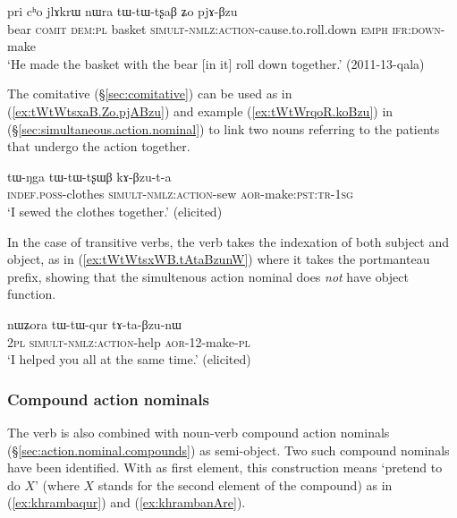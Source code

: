 \begin{exe}
	\ex \label{ex:tWtWtsxaB.Zo.pjABzu}
	\gll  pri cʰo jlɤkrɯ nɯra tɯ-tɯ-tʂaβ ʑo pjɤ-βzu  \\
	bear \textsc{comit} \textsc{dem}:\textsc{pl}  basket  \textsc{simult}-\textsc{nmlz}:\textsc{action}-cause.to.roll.down \textsc{emph} \textsc{ifr}:\textsc{down}-make \\
	\glt `He made the basket with the bear [in it] roll down together.' (2011-13-qala) 
\end{exe}

The comitative (§\ref{sec:comitative}) can be used as in (\ref{ex:tWtWtsxaB.Zo.pjABzu}) and example  (\ref{ex:tWtWrqoR.koBzu}) in  (§\ref{sec:simultaneous.action.nominal}) to link two nouns referring to the patients that undergo the action together.

\begin{exe}
	\ex \label{ex:tWtWtsxWB.kABzuta}
	\gll   tɯ-ŋga tɯ-tɯ-tʂɯβ kɤ-βzu-t-a \\
	\textsc{indef}.\textsc{poss}-clothes \textsc{simult}-\textsc{nmlz}:\textsc{action}-sew \textsc{aor}-make:\textsc{pst}:\textsc{tr}-\textsc{1sg} \\
	\glt `I sewed the clothes together.' (elicited)
\end{exe}

In the case of transitive verbs, the verb  takes the indexation of both subject and object, as in (\ref{ex:tWtWtsxWB.tAtaBzunW}) where it takes the portmanteau  prefix, showing that the simultenous action nominal does \textit{not} have object function.

\begin{exe}
	\ex \label{ex:tWtWtsxWB.tAtaBzunW}
	\gll nɯʑora tɯ-tɯ-qur tɤ-ta-βzu-nɯ \\
	\textsc{2pl} \textsc{simult}-\textsc{nmlz}:\textsc{action}-help \textsc{aor}-1\fl{}2-make-\textsc{pl} \\
	\glt `I helped you all at the same time.' (elicited)
\end{exe}  


\subsubsection{Compound action nominals} \label{sec:compound.action.nominal.Bzu}
The verb  is also combined with noun-verb compound action nominals (§\ref{sec:action.nominal.compounds}) as semi-object. Two such compound nominals have been identified. With  as first element, this construction means `pretend to do $X$' (where $X$ stands for the second element of the compound) as in (\ref{ex:khrambaqur}) and (\ref{ex:khrambanAre}). 

